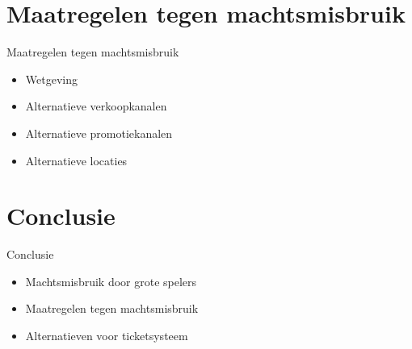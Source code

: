 \documentclass{beamer}
\begin{document}
\section[Maatregelen]{Maatregelen tegen machtsmisbruik}
\begin{frame}{Maatregelen tegen machtsmisbruik}
    \begin{itemize}
        \item Wetgeving
        \item Alternatieve verkoopkanalen
        \item Alternatieve promotiekanalen
        \item Alternatieve locaties
    \end{itemize}
\end{frame}
    
\section{Conclusie}
\begin{frame}{Conclusie}
    \begin{itemize}
        \item Machtsmisbruik door grote spelers
        \item Maatregelen tegen machtsmisbruik
        \item Alternatieven voor ticketsysteem
    \end{itemize}
\end{frame}
\end{document}
